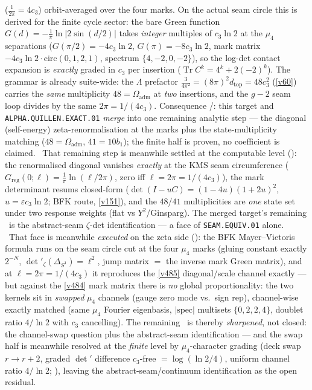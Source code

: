 \documentclass[11pt,a4paper]{article}
\begin{document}
($\tfrac1{2\pi}=4c_3$) orbit-averaged over the four marks. On the actual seam circle this is derived for
the finite cycle sector: the bare Green function $G(d)=-\tfrac1\pi\ln|2\sin(d/2)|$ takes \emph{integer}
multiples of $c_3\ln2$ at the $\mu_4$ separations ($G(\pi/2)=-4c_3\ln2$, $G(\pi)=-8c_3\ln2$, mark matrix
$-4c_3\ln2\cdot\mathrm{circ}(0,1,2,1)$, spectrum $\{4,-2,0,-2\}$), so the log-det contact expansion is
\emph{exactly} graded in $c_3$ per insertion ($\operatorname{Tr}C^k=4^k+2(-2)^k$). The grammar is already
suite-wide: the $\Lambda$ prefactor $\tfrac{3}{4\pi^2}=(8\pi)^2 d_{\mathrm{top}}=48c_3^2$ (\vref{v60})
carries the \emph{same} multiplicity $48=\Omega_{\mathrm{adm}}$ at \emph{two} insertions, and the $g{-}2$
seam loop divides by the same $2\pi=1/(4c_3)$. Consequence \mC/\mO: this target and
\texttt{ALPHA.QUILLEN.EXACT.01} \emph{merge} into one remaining analytic step --- the diagonal
(self-energy) zeta-renormalisation at the marks plus the state-multiplicity matching
($48=\Omega_{\mathrm{adm}}$, $41=10b_1$); the finite half is proven, no coefficient is claimed. \mE\ That
remaining step is meanwhile settled at the computable level ():
the renormalised diagonal vanishes \emph{exactly} at the KMS seam circumference
($G_{\mathrm{reg}}(0;\ell)=\tfrac1\pi\ln(\ell/2\pi)$, zero iff $\ell=2\pi=1/(4c_3)$), the mark
determinant resums closed-form ($\det(I-uC)=(1-4u)(1+2u)^2$, $u=\varepsilon c_3\ln2$; BFK route,
\vref{v151}), and the $48$/$41$ multiplicities are \emph{one} state set under two response weights (flat
vs $Y^2$/Ginsparg). The merged target's remaining \mO\ is the abstract-seam $\zeta$-det identification
--- a face of \texttt{SEAM.EQUIV.01} alone. \mE\ That face is meanwhile \emph{executed} on the zeta side
(): the BFK Mayer--Vietoris formula runs on the seam circle cut at
the four $\mu_4$ marks (gluing constant exactly $2^{-N}$, $\det\nolimits'_\zeta(\Delta_{S^1})=\ell^2$,
jump matrix $=$ the inverse mark Green matrix), and at $\ell=2\pi=1/(4c_3)$ it reproduces the \vref{v485}
diagonal/scale channel exactly --- but against the \vref{v484} mark matrix there is \emph{no} global
proportionality: the two kernels sit in \emph{swapped} $\mu_4$ channels (gauge zero mode vs.\ sign rep),
channel-wise exactly matched (same $\mu_4$ Fourier eigenbasis, $|\mathrm{spec}|$ multisets $\{0,2,2,4\}$,
doublet ratio $4/\ln2$ with $c_3$ cancelling). The remaining \mO\ is thereby \emph{sharpened}, not
closed: the channel-swap question plus the abstract-seam identification --- and the swap half is
meanwhile resolved at the \emph{finite} level by $\mu_4$-character grading (deck swap $r\to r{+}2$,
graded $\det'$ difference $c_3$-free $=\log(\ln2/4)$, uniform channel ratio $4/\ln2$;
), leaving the abstract-seam/continuum identification as the
open residual.
\end{document}
